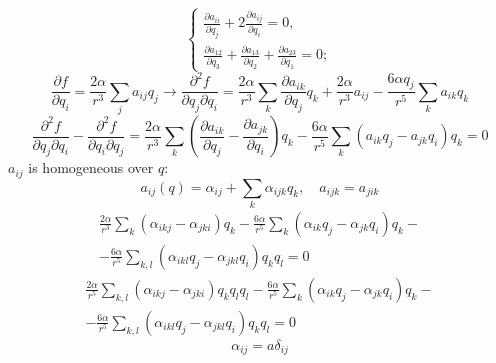 \documentclass[12pt]{article}
\theoremstyle{definition}
\begin{document}
\begin{enumerate}
\begin{itemize}
\begin{itemize}
\begin{equation}
\begin{cases}
                    \frac{\partial a_{ii}}{\partial q_j}+2\frac{\partial a_{ij}}{\partial q_i}=0,\\
                    \frac{\partial a_{12}}{\partial q_3}+\frac{\partial a_{13}}{\partial q_2}+\frac{\partial a_{23}}{\partial q_1}=0;
                \end{cases}
            \end{equation}
            \begin{equation}
                \frac{\partial f}{\partial q_i}=\frac{2\alpha}{r^3}\sum\limits_ja_{ij}q_j\rightarrow\frac{\partial^2f}{\partial q_j\partial q_i}=\frac{2\alpha}{r^3}\sum\limits_k\frac{\partial a_{ik}}{\partial q_j}q_k+\frac{2\alpha}{r^3}a_{ij}-\frac{6\alpha q_j}{r^5}\sum\limits_ka_{ik}q_k
            \end{equation}
            \begin{equation}
                \frac{\partial^2f}{\partial q_j\partial q_i}-\frac{\partial^2f}{\partial q_i\partial q_j}=\frac{2\alpha}{r^3}\sum\limits_k\left(\frac{\partial a_{ik}}{\partial q_j}-\frac{\partial a_{jk}}{\partial q_i}\right)q_k-\frac{6\alpha}{r^5}\sum\limits_k(a_{ik}q_j-a_{jk}q_i)q_k=0
            \end{equation}
            $a_{ij}$ is homogeneous over $q$:
            \begin{equation}
                a_{ij}(q)=\alpha_{ij}+\sum\limits_{k}\alpha_{ijk}q_k,\quad a_{ijk}=a_{jik}
            \end{equation}
            \begin{multline}
                \frac{2\alpha}{r^3}\sum\limits_k\left(\alpha_{ikj}-\alpha_{jki}\right)q_k-\frac{6\alpha}{r^5}\sum\limits_k(\alpha_{ik}q_j-\alpha_{jk}q_i)q_k-\\-\frac{6\alpha}{r^5}\sum\limits_{k,l}(\alpha_{ikl}q_j-\alpha_{jkl}q_i)q_kq_l=0
            \end{multline}
            \begin{multline}
                \frac{2\alpha}{r^5}\sum\limits_{k,l}\left(\alpha_{ikj}-\alpha_{jki}\right)q_kq_lq_l-\frac{6\alpha}{r^5}\sum\limits_k(\alpha_{ik}q_j-\alpha_{jk}q_i)q_k-\\-\frac{6\alpha}{r^5}\sum\limits_{k,l}(\alpha_{ikl}q_j-\alpha_{jkl}q_i)q_kq_l=0
            \end{multline}
            \begin{equation}
                \alpha_{ij}=a\delta_{ij}   
            \end{equation}
            \begin{equation}

\end{equation}
\end{itemize}
\end{itemize}
\end{enumerate}
\end{document}
